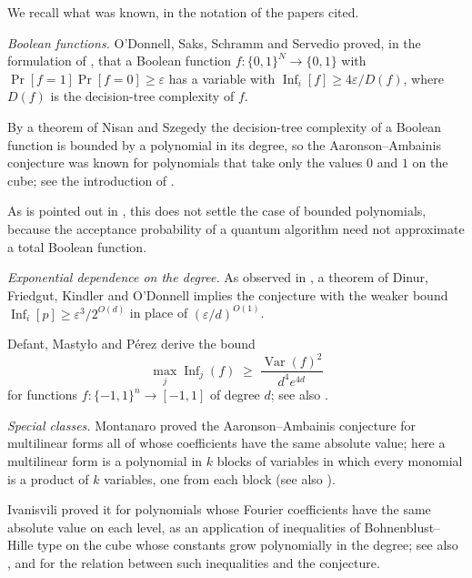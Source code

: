 \documentclass[11pt,reqno]{amsart}
\makeatletter
\theoremstyle{definition}
\theoremstyle{remark}
\numberwithin{equation}{section}
\theoremstyle{named}
\theoremstyle{plain}
\renewcommand{\subsection}{\@startsection{subsection}{2}%
  \z@{1.0\linespacing\@plus.4\linespacing\@minus.15\linespacing}{-.5em}{\normalfont\bfseries}}
\newcommand{\Var}{\operatorname{Var}}
\newcommand{\Inf}{\operatorname{Inf}}
\newcommand{\eps}{\varepsilon}
\makeatother
\begin{document}
\subsection{Earlier work}\label{subsec:earlier}

We recall what was known, in the notation of the papers cited.

\medskip
\emph{Boolean functions.} O'Donnell, Saks, Schramm and Servedio \cite{OSSS} proved, in the formulation
of \cite[Theorem~1.9]{AA14}, that a Boolean function $f\colon\{0,1\}^{N}\to\{0,1\}$ with
$\Pr[{f=1}]\allowbreak\Pr[{f=0}]\ge\eps$ has a variable with $\Inf_i[f]\ge 4\eps/D(f)$, where $D(f)$ is the
decision-tree complexity of $f$.

By a theorem of Nisan and Szegedy \cite{NS} the decision-tree complexity
of a Boolean function is bounded by a polynomial in its degree, so the Aaronson--Ambainis conjecture was known for
polynomials that take only the values $0$ and $1$ on the cube; see the introduction of \cite{LZ}.

As
is pointed out in \cite{AA14}, this does not settle the case of bounded polynomials, because the
acceptance probability of a quantum algorithm need not approximate a total Boolean function.

\medskip
\emph{Exponential dependence on the degree.} As observed in \cite{AA14}, a theorem of Dinur, Friedgut,
Kindler and O'Donnell \cite{DFKO} implies the conjecture with the weaker bound
$\Inf_i[p]\ge\eps^{3}/2^{O(d)}$ in place of $(\eps/d)^{O(1)}$.

Defant, Masty{\l}o and P\'erez
\cite{DMP} derive the bound
\[
   \max_{j}\Inf_j(f)\;\ge\;\frac{\Var(f)^{2}}{d^{4}e^{4d}}
\]
for functions $f\colon\{-1,1\}^{n}\to[-1,1]$ of degree $d$; see also \cite{OZ}.

\medskip
\emph{Special classes.} Montanaro \cite{Mon} proved the Aaronson--Ambainis conjecture for multilinear forms all of whose
coefficients have the same absolute value; here a multilinear form is a polynomial in $k$ blocks of
variables in which every monomial is a product of $k$ variables, one from each block (see also
\cite[Section~1.3]{AA14}).

Ivanisvili \cite{Iva} proved it for polynomials whose Fourier coefficients
have the same absolute value on each level, as an application of inequalities of
Bohnenblust--Hille type on the cube whose constants grow polynomially in the degree; see also
\cite{STV}, and \cite{DMP} for the relation between such inequalities and the conjecture.
\end{document}
